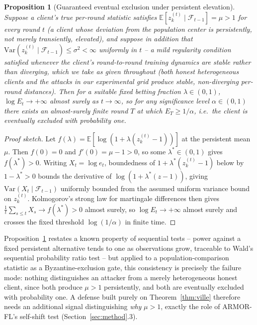 \documentclass[pdflatex,iicol,sn-mathphys-num]{sn-jnl}%
\theoremstyle{thmstyleone}%
\newtheorem{proposition}[theorem]{Proposition}%
\theoremstyle{thmstyletwo}%
\theoremstyle{thmstylethree}%
\begin{document}
\begin{proposition}[Guaranteed eventual exclusion under persistent elevation]\label{prop:eventual-exclusion}
Suppose a client's true per-round statistic satisfies $\mathbb{E}[z_k^{(t)} \mid \mathcal{F}_{t-1}] = \mu > 1$ for every round $t$ (a client whose deviation from the population center is persistently, not merely transiently, elevated), and suppose in addition that $\mathrm{Var}(z_k^{(t)} \mid \mathcal{F}_{t-1}) \le \sigma^2 < \infty$ uniformly in $t$ -- a mild regularity condition satisfied whenever the client's round-to-round training dynamics are stable rather than diverging, which we take as given throughout (both honest heterogeneous clients and the attacks in our experimental grid produce stable, non-diverging per-round distances). Then for a suitable fixed betting fraction $\lambda \in (0,1)$, $\log E_t \to +\infty$ almost surely as $t \to \infty$, so for any significance level $\alpha \in (0,1)$ there exists an almost-surely finite round $T$ at which $E_T \ge 1/\alpha$, i.e.\ the client is eventually excluded with probability one.
\end{proposition}

\begin{proof}[Proof sketch]
Let $f(\lambda) = \mathbb{E}[\log(1 + \lambda(z_k^{(t)} - 1))]$ at the persistent mean $\mu$. Then $f(0)=0$ and $f'(0)=\mu-1>0$, so some $\lambda^*\in(0,1)$ gives $f(\lambda^*)>0$. Writing $X_t=\log e_t$, boundedness of $1+\lambda^*(z_k^{(t)}-1)$ below by $1-\lambda^*>0$ bounds the derivative of $\log(1+\lambda^*(z-1))$, giving $\mathrm{Var}(X_t\mid\mathcal{F}_{t-1})$ uniformly bounded from the assumed uniform variance bound on $z_k^{(t)}$. Kolmogorov's strong law for martingale differences then gives $\frac{1}{t}\sum_{s\le t}X_s \to f(\lambda^*)>0$ almost surely, so $\log E_t \to +\infty$ almost surely and crosses the fixed threshold $\log(1/\alpha)$ in finite time.
\end{proof}

Proposition~\ref{prop:eventual-exclusion} restates a known property of sequential tests -- power against a fixed persistent alternative tends to one as observations grow, traceable to Wald's sequential probability ratio test \citep{wald1945sprt} -- but applied to a population-comparison statistic as a Byzantine-exclusion gate, this consistency is precisely the failure mode: nothing distinguishes an attacker from a merely heterogeneous honest client, since both produce $\mu>1$ persistently, and both are eventually excluded with probability one. A defense built purely on Theorem~\ref{thm:ville} therefore needs an additional signal distinguishing \emph{why} $\mu>1$, exactly the role of ARMOR-FL's self-shift test (Section~\ref{sec:method}.3).
\end{document}
